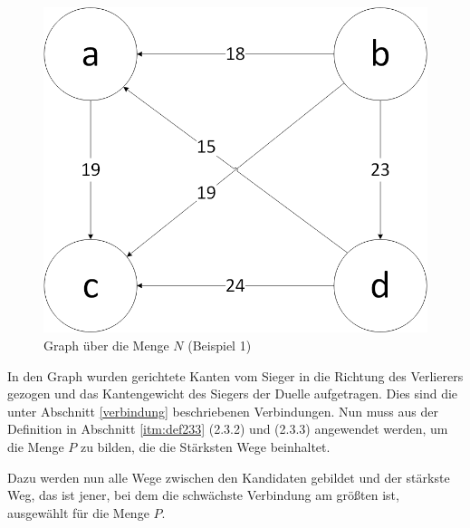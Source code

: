 \begin{figure}[!h]
\centering
\includegraphics[scale=0.5]{Bilder/Beispiel1_Graph.png}
\caption{Graph über die Menge $N$ (Beispiel 1)}
\label{fig:graph1}
\end{figure}

In den Graph wurden gerichtete Kanten vom Sieger in die Richtung des Verlierers gezogen und das Kantengewicht des Siegers der Duelle aufgetragen. Dies sind die unter Abschnitt \ref{verbindung} beschriebenen Verbindungen. Nun muss aus der Definition in Abschnitt \ref{itm:def233} (2.3.2) und  (2.3.3) angewendet werden, um die Menge $P$ zu bilden, die die Stärksten Wege beinhaltet.

Dazu werden nun alle Wege zwischen den Kandidaten gebildet und der stärkste Weg, das ist jener, bei dem die schwächste Verbindung am größten ist, ausgewählt für die Menge $P$.

